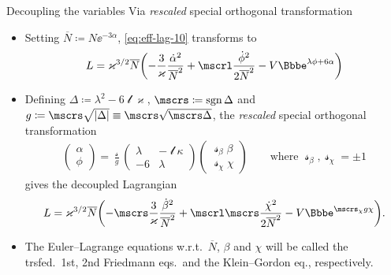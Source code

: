 \documentclass[9pt]{beamer}
\begin{document}
\begin{frame}%
{Decoupling the variables}%
{Via \emph{rescaled} special orthogonal transformation}
\begin{itemize}
\item Setting $\overline{N} \coloneqq N\ee^{-3\alpha}$, \cref{eq:eff-lag-10}
transforms to
\begin{align}
L = \varkappa^{3/2}\overline{N}
\rbr{-\frac{3}{\varkappa}\frac{\dot{\alpha}^2}{\overline{N}^2}
+\mscrl\frac{\dot{\phi}^2}{2\overline{N}^2} - V\ee^{\lambda\phi+6\alpha}}
\end{align}

\item Defining $\Delta \coloneqq \lambda^2 - 6\mscrl\varkappa$,
$\mscrs \coloneqq \sgn \Delta$ and
$g \coloneqq \mscrs \sqrt{\vbr{\Delta}} \equiv \mscrs\sqrt{\mscrs\Delta}$,
the \emph{rescaled} special orthogonal transformation
\begin{align}
\begin{pmatrix}
\alpha \\ \phi
\end{pmatrix} = \frac{\mscrs}{g}
\begin{pmatrix}
\lambda & -\mscrl\kappa \\
-6 & \lambda
\end{pmatrix}
\begin{pmatrix}
\mscrs_\beta \beta \\ \mscrs_\chi \chi
\end{pmatrix}\qquad\text{where } \mscrs_\beta, \mscrs_\chi = \pm 1
\end{align}
gives the decoupled Lagrangian
\begin{align}
L = \varkappa^{3/2}\overline{N}
\rbr{-\mscrs\frac{3}{\varkappa}\frac{\dot{\beta}^2}{\overline{N}^2}
+\mscrl\mscrs\frac{\dot{\chi}^2}{2\overline{N}^2}
-V\ee^{\mscrs_\chi g\chi}}.
\label{eq:lagrangian-decoupled}
\end{align}

\item
The Euler--Lagrange equations w.r.t.\ $\overline{N}$, $\beta$ and
$\chi$ will be called the trsfed.\ 1st, 2nd Friedmann eqs.\ and the
Klein--Gordon eq., respectively.
\end{itemize}
\end{frame}
\end{document}
